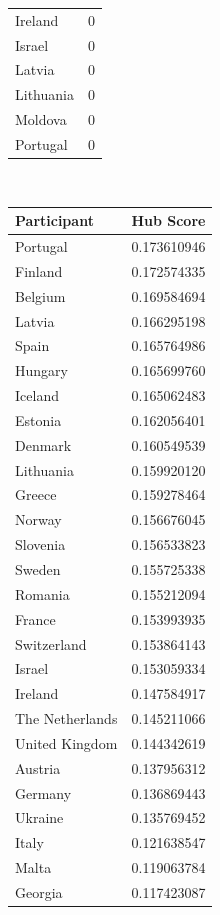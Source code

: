 \documentclass[a4paper,11pt]{report}
\begin{document}
\begin{table}[h!]
\begin{tabular}{l | r}
Ireland         & 0               \\
Israel          & 0               \\
Latvia          & 0               \\
Lithuania       & 0               \\
Moldova         & 0               \\
Portugal        & 0              
\end{tabular}
$\;\;\;$
\begin{tabular}{l|r}
\textbf{Participant}     & \textbf{Hub Score}   \\\hline 
Portugal        & 0.173610946 \\
Finland         & 0.172574335 \\
Belgium         & 0.169584694 \\
Latvia          & 0.166295198 \\
Spain           & 0.165764986 \\
Hungary         & 0.165699760  \\
Iceland         & 0.165062483 \\
Estonia         & 0.162056401 \\
Denmark         & 0.160549539 \\
Lithuania       & 0.159920120  \\
Greece          & 0.159278464 \\
Norway          & 0.156676045 \\
Slovenia        & 0.156533823 \\
Sweden          & 0.155725338 \\
Romania         & 0.155212094 \\
France          & 0.153993935 \\
Switzerland     & 0.153864143 \\
Israel          & 0.153059334 \\
Ireland         & 0.147584917 \\
The Netherlands & 0.145211066 \\
United Kingdom  & 0.144342619 \\
Austria         & 0.137956312 \\
Germany         & 0.136869443 \\
Ukraine         & 0.135769452 \\
Italy           & 0.121638547 \\
Malta           & 0.119063784 \\
Georgia         & 0.117423087 \\

\end{tabular}
\end{table}
\end{document}
